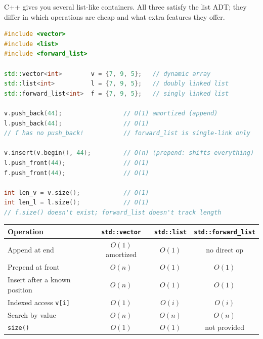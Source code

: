 \documentclass[11pt]{article}
\begin{document}
C++ gives you several list-like containers. All three satisfy the
list ADT; they differ in which operations are cheap and what extra
features they offer.

\begin{examplebox}
\begin{lstlisting}[basicstyle=\ttfamily\small,frame=single,language=C++]
#include <vector>
#include <list>
#include <forward_list>

std::vector<int>        v = {7, 9, 5};   // dynamic array
std::list<int>          l = {7, 9, 5};   // doubly linked list
std::forward_list<int>  f = {7, 9, 5};   // singly linked list

v.push_back(44);                 // O(1) amortized (append)
l.push_back(44);                 // O(1)
// f has no push_back!           // forward_list is single-link only

v.insert(v.begin(), 44);         // O(n) (prepend: shifts everything)
l.push_front(44);                // O(1)
f.push_front(44);                // O(1)

int len_v = v.size();            // O(1)
int len_l = l.size();            // O(1)
// f.size() doesn't exist; forward_list doesn't track length
\end{lstlisting}
\end{examplebox}

\begin{center}
\footnotesize
\renewcommand{\arraystretch}{1.3}
\begin{tabular}{@{}lccc@{}}
\hline
\textbf{Operation}            & \texttt{std::vector} & \texttt{std::list} & \texttt{std::forward\_list} \\
\hline
Append at end                 & $O(1)$ amortized     & $O(1)$             & no direct op \\
Prepend at front              & $O(n)$               & $O(1)$             & $O(1)$ \\
Insert after a known position & $O(n)$               & $O(1)$             & $O(1)$ \\
Indexed access \texttt{v[i]}  & $O(1)$               & $O(i)$             & $O(i)$ \\
Search by value               & $O(n)$               & $O(n)$             & $O(n)$ \\
\texttt{size()}               & $O(1)$               & $O(1)$             & not provided \\
\hline
\end{tabular}
\end{center}
\end{document}
